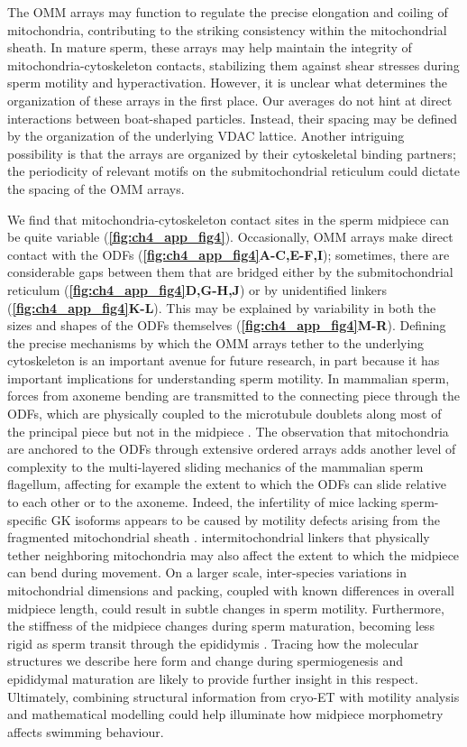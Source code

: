 The OMM arrays may function to regulate the precise elongation and coiling of mitochondria, contributing to the striking consistency within the mitochondrial sheath. In mature sperm, these arrays may help maintain the integrity of mitochondria-cytoskeleton contacts, stabilizing them against shear stresses during sperm motility and hyperactivation. However, it is unclear what determines the organization of these arrays in the first place. Our averages do not hint at direct interactions between boat-shaped particles. Instead, their spacing may be defined by the organization of the underlying VDAC lattice. Another intriguing possibility is that the arrays are organized by their cytoskeletal binding partners; the periodicity of relevant motifs on the submitochondrial reticulum could dictate the spacing of the OMM arrays.

We find that mitochondria-cytoskeleton contact sites in the sperm midpiece can be quite variable \linebreak (\textbf{\autoref{fig:ch4_app_fig4}}). Occasionally, OMM arrays make direct contact with the ODFs (\textbf{\autoref{fig:ch4_app_fig4}A-C,E-F,I}); sometimes, there are considerable gaps between them that are bridged either by the submitochondrial reticulum (\textbf{\autoref{fig:ch4_app_fig4}D,G-H,J}) or by unidentified linkers (\textbf{\autoref{fig:ch4_app_fig4}K-L}). This may be explained by variability in both the sizes and shapes of the ODFs themselves (\textbf{\autoref{fig:ch4_app_fig4}M-R}). Defining the precise mechanisms by which the OMM arrays tether to the underlying cytoskeleton is an important avenue for future research, in part because it has important implications for understanding sperm motility. In mammalian sperm, forces from axoneme bending are transmitted to the connecting piece through the ODFs, which are physically coupled to the microtubule doublets along most of the principal piece but not in the midpiece \cite{Lesich2014, Leung2021}. The observation that mitochondria are anchored to the ODFs through extensive ordered arrays adds another level of complexity to the multi-layered sliding mechanics of the mammalian sperm flagellum, affecting for example the extent to which the ODFs can slide relative to each other or to the axoneme. Indeed, the infertility of mice lacking sperm-specific GK isoforms appears to be caused by motility defects arising from the fragmented mitochondrial sheath \cite{Chen2017a, Shimada2019}. intermitochondrial linkers that physically tether neighboring mitochondria may also affect the extent to which the midpiece can bend during movement. On a larger scale, inter-species variations in mitochondrial dimensions and packing, coupled with known differences in overall midpiece length, could result in subtle changes in sperm motility. Furthermore, the stiffness of the midpiece changes during sperm maturation, becoming less rigid as sperm transit through the epididymis \cite{Jeulin1996, Miyata2015}. Tracing how the molecular structures we describe here form and change during spermiogenesis and epididymal maturation are likely to provide further insight in this respect. Ultimately, combining structural information from cryo-ET with motility analysis and mathematical modelling could help illuminate how midpiece morphometry affects swimming behaviour.

